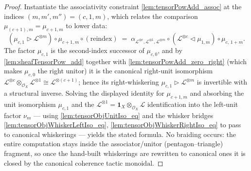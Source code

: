 \begin{proof}
  \leanok
  Instantiate the associativity constraint \cref{lem:tensorPowAdd_assoc} at the
  indices \((m,m',m'') = (c,1,m)\), which relates the comparison
  \(\mu_{(c+1),m} = \mu_{c+1,m}\) to lower data:
  \[
    (\mu_{c,1} \rhd \mathcal{L}^{\otimes m}) \circ \mu_{c+1,m}
      \circ (\text{reindex})
    \;=\;
    \alpha_{\mathcal{L}^{\otimes c},\mathcal{L}^{\otimes 1},
        \mathcal{L}^{\otimes m}} \circ
      (\mathcal{L}^{\otimes c} \lhd \mu_{1,m}) \circ \mu_{c,\,1+m}.
  \]
  The factor \(\mu_{c,1}\) is the second-index successor of \(\mu_{c,0}\), and by
  \cref{lem:sheafTensorPow_add} together with \cref{lem:tensorPowAdd_zero_right}
  (which makes \(\mu_{c,0}\) the right unitor) it is the canonical right-unit
  isomorphism \(\mathcal{L}^{\otimes c}\otimes_{\mathcal{O}_X}\mathcal{L}^{
  \otimes 1}\cong\mathcal{L}^{\otimes(c+1)}\); hence its right-whiskering
  \(\mu_{c,1}\rhd\mathcal{L}^{\otimes m}\) is invertible with a structural
  inverse. Solving the displayed identity for \(\mu_{c+1,m}\) and absorbing the
  unit isomorphism \(\mu_{c,1}\) and the \(\mathcal{L}^{\otimes 1}=\mathbf{1}_X
  \otimes_{\mathcal{O}_X}\mathcal{L}\) identification into the left-unit factor
  \(\nu_m\) --- using \cref{lem:tensorObjUnitIso_eq} and the whisker bridges
  \cref{lem:tensorObjWhiskerLeftIso_eq}, \cref{lem:tensorObjWhiskerRightIso_eq} to
  pass to canonical whiskerings --- yields the stated formula. No braiding occurs:
  the entire computation stays inside the associator/unitor (pentagon--triangle)
  fragment, so once the hand-built whiskerings are rewritten to canonical ones it
  is closed by the canonical coherence tactic \(\mathrm{monoidal}\).
\end{proof}

